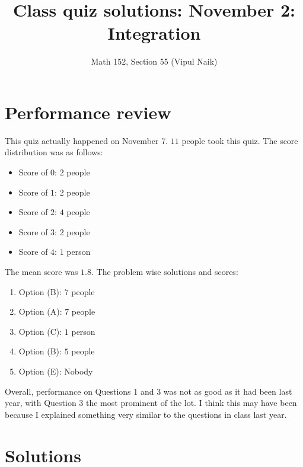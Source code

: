 \documentclass[10pt]{amsart}
\title{Class quiz solutions: November 2: Integration}
\author{Math 152, Section 55 (Vipul Naik)}
\begin{document}
\maketitle

\section{Performance review}

This quiz actually happened on November 7. $11$ people took this
quiz. The score distribution was as follows:

\begin{itemize}
\item Score of $0$: $2$ people
\item Score of $1$: $2$ people
\item Score of $2$: $4$ people
\item Score of $3$: $2$ people
\item Score of $4$: $1$ person
\end{itemize}

The mean score was $1.8$. The problem wise solutions and scores:

\begin{enumerate}
\item Option (B): $7$ people
\item Option (A): $7$ people
\item Option (C): $1$ person
\item Option (B): $5$ people
\item Option (E): Nobody
\end{enumerate}

Overall, performance on Questions 1 and 3 was not as good as it had
been last year, with Question 3 the most prominent of the lot. I think
this may have been because I explained something very similar to the
questions in class last year.
\section{Solutions}
\end{document}
